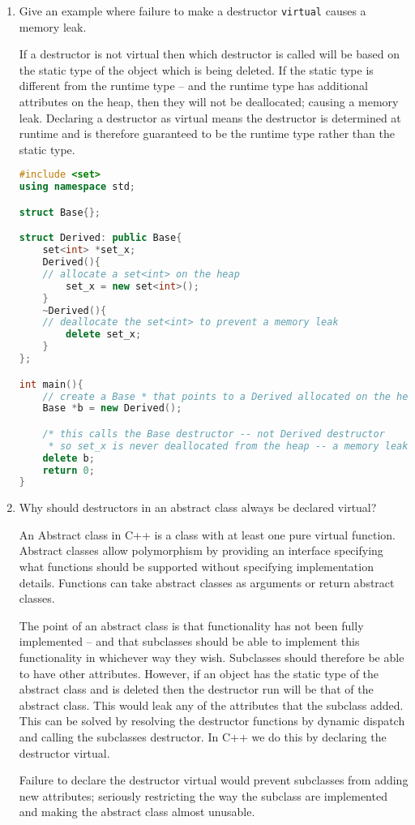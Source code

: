 \documentclass[10pt,\jkfside,a4paper]{article}
\begin{document}
\begin{enumerate}

\item Give an example where failure to make a destructor \texttt{virtual}
causes a memory leak.

If a destructor is not virtual then which destructor is called will be based
on the static type of the object which is being deleted. If the static type
is different from the runtime type -- and the runtime type has additional
attributes on the heap, then they will not be deallocated; causing a memory
leak. Declaring a destructor as virtual means the destructor is determined
at runtime and is therefore guaranteed to be the runtime type rather than
the static type.

\begin{lstlisting}[language=C++]
#include <set>
using namespace std;

struct Base{};

struct Derived: public Base{
    set<int> *set_x;
    Derived(){
    // allocate a set<int> on the heap
        set_x = new set<int>();
    }
    ~Derived(){
    // deallocate the set<int> to prevent a memory leak
        delete set_x;
    }
};

int main(){
	// create a Base * that points to a Derived allocated on the heap
    Base *b = new Derived();

    /* this calls the Base destructor -- not Derived destructor
     * so set_x is never deallocated from the heap -- a memory leak! */
    delete b;
    return 0;
}
\end{lstlisting}

\item Why should destructors in an abstract class always be declared virtual?

An Abstract class in C++ is a class with at least one pure virtual function.
Abstract classes allow polymorphism by providing an interface specifying
what functions should be supported without specifying implementation details.
Functions can take abstract classes as arguments or return abstract classes.

The point of an abstract class is that functionality has not been fully
implemented -- and that subclasses should be able to implement this
functionality in whichever way they wish. Subclasses should therefore be
able to have other attributes. However, if an object has the static type of
the abstract class and is deleted then the destructor run will be that of the
abstract class. This would leak any of the attributes that the subclass added.
This can be solved by resolving the destructor functions by dynamic dispatch
and calling the subclasses destructor. In C++ we do this by declaring the
destructor virtual.

Failure to declare the destructor virtual would prevent subclasses from
adding new attributes; seriously restricting the way the subclass are
implemented and making the abstract class almost unusable.

\end{enumerate}
\end{document}
